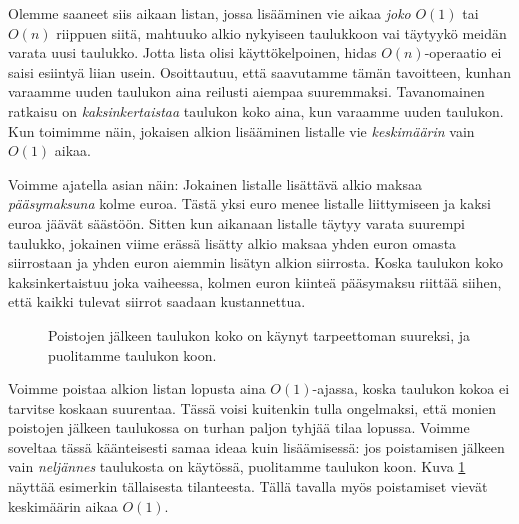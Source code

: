Olemme saaneet siis aikaan listan, jossa lisääminen
vie aikaa \emph{joko} $O(1)$ tai $O(n)$ riippuen siitä,
mahtuuko alkio nykyiseen taulukkoon vai täytyykö
meidän varata uusi taulukko.
Jotta lista olisi käyttökelpoinen, hidas $O(n)$-operaatio
ei saisi esiintyä liian usein.
Osoittautuu, että saavutamme tämän tavoitteen,
kunhan varaamme uuden taulukon aina reilusti aiempaa suuremmaksi.
Tavanomainen ratkaisu on \emph{kaksinkertaistaa} taulukon koko aina,
kun varaamme uuden taulukon.
Kun toimimme näin, jokaisen alkion lisääminen listalle vie
\emph{keskimäärin} vain $O(1)$ aikaa.

Voimme ajatella asian näin: Jokainen listalle lisättävä alkio
maksaa \emph{pääsy\-maksuna} kolme euroa.
Tästä yksi euro menee listalle liittymiseen ja kaksi euroa jäävät säästöön.
Sitten kun aikanaan listalle täytyy varata suurempi taulukko,
jokainen viime erässä lisätty alkio maksaa yhden euron omasta siirrostaan
ja yhden euron aiemmin lisätyn alkion siirrosta.
Koska taulukon koko kaksinkertaistuu joka vaiheessa,
kolmen euron kiinteä pääsymaksu riittää siihen, että kaikki tulevat
siirrot saadaan kustannettua.

\begin{figure}
\center
{}
\caption{Poistojen jälkeen taulukon koko on käynyt tarpeettoman suureksi,
ja puolitamme taulukon koon.}                                                                        
\label{fig:lispoi}
\end{figure}

Voimme poistaa alkion listan lopusta aina $O(1)$-ajassa,
koska taulukon kokoa ei tarvitse koskaan suurentaa.
Tässä voisi kuitenkin tulla ongelmaksi, että monien poistojen
jälkeen taulukossa on turhan paljon tyhjää tilaa lopussa.
Voimme soveltaa tässä käänteisesti samaa ideaa kuin lisäämisessä:
jos poistamisen jälkeen vain \emph{neljännes} taulukosta on käytössä,
puolitamme taulukon koon.
Kuva \ref{fig:lispoi} näyttää esimerkin tällaisesta tilanteesta.
Tällä tavalla myös poistamiset vievät keskimäärin aikaa $O(1)$.

